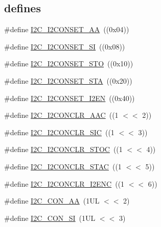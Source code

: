 \subsection*{\textquotesingle{}defines\textquotesingle{}}
\begin{DoxyCompactItemize}
\item 
\#define \hyperlink{group___i2_c__18_x_x__43_x_x_ga784c4b2fe7f3299e338655d2ddbf283c}{I2\+C\+\_\+\+I2\+C\+O\+N\+S\+E\+T\+\_\+\+AA}~((0x04))
\item 
\#define \hyperlink{group___i2_c__18_x_x__43_x_x_gaa447cd2686805ef8009fc599144ee3dc}{I2\+C\+\_\+\+I2\+C\+O\+N\+S\+E\+T\+\_\+\+SI}~((0x08))
\item 
\#define \hyperlink{group___i2_c__18_x_x__43_x_x_gaae292803a059b84eac20ab8777d113af}{I2\+C\+\_\+\+I2\+C\+O\+N\+S\+E\+T\+\_\+\+S\+TO}~((0x10))
\item 
\#define \hyperlink{group___i2_c__18_x_x__43_x_x_gabaad3370eb35644c135d40f06adbbba0}{I2\+C\+\_\+\+I2\+C\+O\+N\+S\+E\+T\+\_\+\+S\+TA}~((0x20))
\item 
\#define \hyperlink{group___i2_c__18_x_x__43_x_x_gab836acc31e0572bb0d0db614f0641f15}{I2\+C\+\_\+\+I2\+C\+O\+N\+S\+E\+T\+\_\+\+I2\+EN}~((0x40))
\item 
\#define \hyperlink{group___i2_c__18_x_x__43_x_x_gaa13b19babb8442aa9047f8ecb92a908d}{I2\+C\+\_\+\+I2\+C\+O\+N\+C\+L\+R\+\_\+\+A\+AC}~((1 $<$$<$ 2))
\item 
\#define \hyperlink{group___i2_c__18_x_x__43_x_x_ga36753112210a8c33d566b572b63b753b}{I2\+C\+\_\+\+I2\+C\+O\+N\+C\+L\+R\+\_\+\+S\+IC}~((1 $<$$<$ 3))
\item 
\#define \hyperlink{group___i2_c__18_x_x__43_x_x_ga449d7af35550484c4dfefcddd01095b8}{I2\+C\+\_\+\+I2\+C\+O\+N\+C\+L\+R\+\_\+\+S\+T\+OC}~((1 $<$$<$ 4))
\item 
\#define \hyperlink{group___i2_c__18_x_x__43_x_x_gab6148bf41d7fc32bd259d2f6a7d7667d}{I2\+C\+\_\+\+I2\+C\+O\+N\+C\+L\+R\+\_\+\+S\+T\+AC}~((1 $<$$<$ 5))
\item 
\#define \hyperlink{group___i2_c__18_x_x__43_x_x_ga92718ac11d46f6e32d526749f09d01b2}{I2\+C\+\_\+\+I2\+C\+O\+N\+C\+L\+R\+\_\+\+I2\+E\+NC}~((1 $<$$<$ 6))
\item 
\#define \hyperlink{group___i2_c__18_x_x__43_x_x_gafd39e9ced8b71fd55deb05d7a23752b9}{I2\+C\+\_\+\+C\+O\+N\+\_\+\+AA}~(1\+U\+L $<$$<$ 2)
\item 
\#define \hyperlink{group___i2_c__18_x_x__43_x_x_gad53ba19314d57093aaa5076897604a50}{I2\+C\+\_\+\+C\+O\+N\+\_\+\+SI}~(1\+U\+L $<$$<$ 3)
\item 
$$
\end{DoxyCompactItemize}
